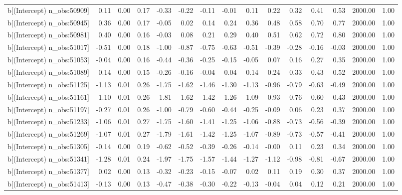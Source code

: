 \begin{table}[ht]
\begin{tabular}{rrrrrrrrrrrrrrr}
  b[(Intercept) n\_obs:50909] & 0.11 & 0.00 & 0.17 & -0.33 & -0.22 & -0.11 & -0.01 & 0.11 & 0.22 & 0.32 & 0.41 & 0.53 & 2000.00 & 1.00 \\ 
  b[(Intercept) n\_obs:50945] & 0.36 & 0.00 & 0.17 & -0.05 & 0.02 & 0.14 & 0.24 & 0.36 & 0.48 & 0.58 & 0.70 & 0.77 & 2000.00 & 1.00 \\ 
  b[(Intercept) n\_obs:50981] & 0.40 & 0.00 & 0.16 & -0.03 & 0.08 & 0.21 & 0.29 & 0.40 & 0.51 & 0.62 & 0.72 & 0.80 & 2000.00 & 1.00 \\ 
  b[(Intercept) n\_obs:51017] & -0.51 & 0.00 & 0.18 & -1.00 & -0.87 & -0.75 & -0.63 & -0.51 & -0.39 & -0.28 & -0.16 & -0.03 & 2000.00 & 1.00 \\ 
  b[(Intercept) n\_obs:51053] & -0.04 & 0.00 & 0.16 & -0.44 & -0.36 & -0.25 & -0.15 & -0.05 & 0.07 & 0.16 & 0.27 & 0.35 & 2000.00 & 1.00 \\ 
  b[(Intercept) n\_obs:51089] & 0.14 & 0.00 & 0.15 & -0.26 & -0.16 & -0.04 & 0.04 & 0.14 & 0.24 & 0.33 & 0.43 & 0.52 & 2000.00 & 1.00 \\ 
  b[(Intercept) n\_obs:51125] & -1.13 & 0.01 & 0.26 & -1.75 & -1.62 & -1.46 & -1.30 & -1.13 & -0.96 & -0.79 & -0.63 & -0.49 & 2000.00 & 1.00 \\ 
  b[(Intercept) n\_obs:51161] & -1.10 & 0.01 & 0.26 & -1.81 & -1.62 & -1.42 & -1.26 & -1.09 & -0.93 & -0.76 & -0.60 & -0.43 & 2000.00 & 1.00 \\ 
  b[(Intercept) n\_obs:51197] & -0.27 & 0.01 & 0.26 & -1.00 & -0.79 & -0.60 & -0.44 & -0.25 & -0.09 & 0.06 & 0.23 & 0.37 & 2000.00 & 1.00 \\ 
  b[(Intercept) n\_obs:51233] & -1.06 & 0.01 & 0.27 & -1.75 & -1.60 & -1.41 & -1.25 & -1.06 & -0.88 & -0.73 & -0.56 & -0.39 & 2000.00 & 1.00 \\ 
  b[(Intercept) n\_obs:51269] & -1.07 & 0.01 & 0.27 & -1.79 & -1.61 & -1.42 & -1.25 & -1.07 & -0.89 & -0.73 & -0.57 & -0.41 & 2000.00 & 1.00 \\ 
  b[(Intercept) n\_obs:51305] & -0.14 & 0.00 & 0.19 & -0.62 & -0.52 & -0.39 & -0.26 & -0.14 & -0.00 & 0.11 & 0.23 & 0.34 & 2000.00 & 1.00 \\ 
  b[(Intercept) n\_obs:51341] & -1.28 & 0.01 & 0.24 & -1.97 & -1.75 & -1.57 & -1.44 & -1.27 & -1.12 & -0.98 & -0.81 & -0.67 & 2000.00 & 1.00 \\ 
  b[(Intercept) n\_obs:51377] & 0.02 & 0.00 & 0.13 & -0.32 & -0.23 & -0.15 & -0.07 & 0.02 & 0.11 & 0.19 & 0.30 & 0.37 & 2000.00 & 1.00 \\ 
  b[(Intercept) n\_obs:51413] & -0.13 & 0.00 & 0.13 & -0.47 & -0.38 & -0.30 & -0.22 & -0.13 & -0.04 & 0.04 & 0.12 & 0.21 & 2000.00 & 1.00 \\ 

\end{tabular}
\end{table}
